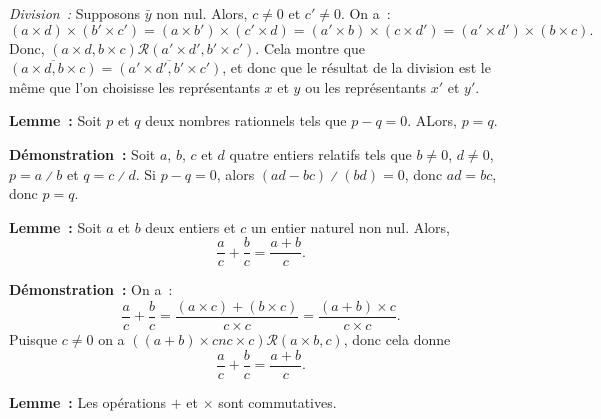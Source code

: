 \noindent\emph{Division :} Supposons $\bar{y}$ non nul. Alors, $c \neq 0$ et $c' \neq 0$.
    On a :
    \begin{equation*}
        (a \times d) \times (b' \times c')
        = (a \times b') \times (c' \times d)
        = (a' \times b) \times (c \times d')
        = (a' \times d') \times (b \times c) .
    \end{equation*}
    Donc, $(a \times d, b \times c) \mathrel{\mathcal{R}} (a' \times d', b' \times c')$. 
    Cela montre que $\overline{(a \times d, b \times c)} = \overline{(a' \times d', b' \times c')}$, et donc que le résultat de la division est le même que l'on choisisse les représentants $x$ et $y$ ou les représentants $x'$ et $y'$.

\done

\medskip

\noindent\textbf{Lemme :} Soit $p$ et $q$ deux nombres rationnels tels que $p - q = 0$.
    ALors, $p = q$.

\medskip

\noindent\textbf{Démonstration :} Soit $a$, $b$, $c$ et $d$ quatre entiers relatifs tels que $b \neq 0$, $d \neq 0$, $p = a \divslash b$ et $q = c \divslash d$.
    Si $p - q = 0$, alors $(a d - b c) \divslash (b d) = 0$, donc $a d = b c$, donc $p = q$.

    \done

\medskip

\noindent\textbf{Lemme :} Soit $a$ et $b$ deux entiers et $c$ un entier naturel non nul.
    Alors,
    \begin{equation*}
        \frac{a}{c} + \frac{b}{c} = \frac{a + b}{c}.
    \end{equation*}

\medskip

\noindent\textbf{Démonstration :} On a : 
    \begin{equation*}
        \frac{a}{c} + \frac{b}{c} 
        = \frac{(a \times c) + (b \times c)}{c \times c}
        = \frac{(a + b) \times c}{c \times c}.
    \end{equation*}
    Puisque $c \neq 0$ on a $((a + b) \times cn c \times c) \mathrel{\mathcal{R}} (a \times b, c)$, donc cela donne 
    \begin{equation*}
        \frac{a}{c} + \frac{b}{c} 
        = \frac{a + b}{c}.
    \end{equation*}

    \done

\medskip

\noindent\textbf{Lemme :} Les opérations $+$ et $\times$ sont commutatives.

